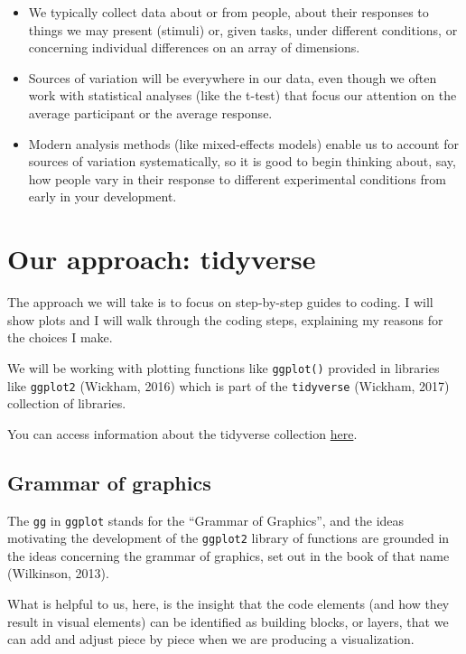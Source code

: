 \documentclass[
  letterpaper,
  DIV=11,
  numbers=noendperiod]{scrreprt}
\providecommand{\tightlist}{%
  \setlength{\itemsep}{0pt}\setlength{\parskip}{0pt}}\usepackage{longtable,booktabs,array}
\begin{document}
\begin{itemize}
\tightlist
\item
  We typically collect data about or from people, about their responses
  to things we may present (stimuli) or, given tasks, under different
  conditions, or concerning individual differences on an array of
  dimensions.
\item
  Sources of variation will be everywhere in our data, even though we
  often work with statistical analyses (like the t-test) that focus our
  attention on the average participant or the average response.
\item
  Modern analysis methods (like mixed-effects models) enable us to
  account for sources of variation systematically, so it is good to
  begin thinking about, say, how people vary in their response to
  different experimental conditions from early in your development.
\end{itemize}

\hypertarget{sec-tidyverse}{%
\section{Our approach: tidyverse}\label{sec-tidyverse}}

The approach we will take is to focus on step-by-step guides to coding.
I will show plots and I will walk through the coding steps, explaining
my reasons for the choices I make.

We will be working with plotting functions like \texttt{ggplot()}
provided in libraries like \texttt{ggplot2} (Wickham, 2016) which is
part of the \texttt{tidyverse} (Wickham, 2017) collection of libraries.

You can access information about the tidyverse collection
\href{https://www.tidyverse.org}{here}.

\hypertarget{sec-grammar-graphics}{%
\subsection{Grammar of graphics}\label{sec-grammar-graphics}}

The \texttt{gg} in \texttt{ggplot} stands for the ``Grammar of
Graphics'', and the ideas motivating the development of the
\texttt{ggplot2} library of functions are grounded in the ideas
concerning the grammar of graphics, set out in the book of that name
(Wilkinson, 2013).

What is helpful to us, here, is the insight that the code elements (and
how they result in visual elements) can be identified as building
blocks, or layers, that we can add and adjust piece by piece when we are
producing a visualization.
\end{document}

